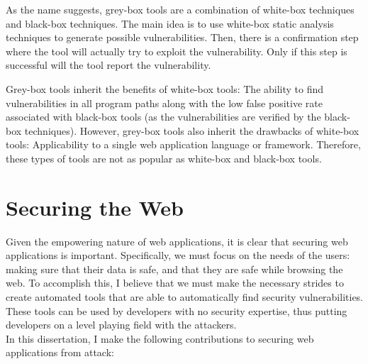 As the name suggests, grey-box tools are a combination of white-box
techniques and black-box techniques. The main idea is to use white-box
static analysis techniques to generate possible vulnerabilities. Then,
there is a confirmation step where the tool will actually try to
exploit the vulnerability. Only if this step is successful will the
tool report the vulnerability.

Grey-box tools inherit the benefits of white-box tools: The ability to
find vulnerabilities in all program paths along with the low false
positive rate associated with black-box tools (as the vulnerabilities
are verified by the black-box techniques). However, grey-box tools also
inherit the drawbacks of white-box tools: Applicability to a single web
application language or framework. Therefore, these types of tools are
not as popular as white-box and black-box tools. 

\section{Securing the Web}

\noindent{}Given the empowering nature of web applications, it is
clear that securing web applications is important.
Specifically, we must focus on the needs of the users: making sure
that their data is safe, and that they are safe while browsing the
web. To accomplish this, I believe that we must make the necessary
strides to create automated tools that are able to automatically find
security vulnerabilities. These tools can be used by developers with
no security expertise, thus putting developers on a level playing
field with the attackers.
\\

\noindent{}In this dissertation, I make the following contributions to securing
web applications from attack:

